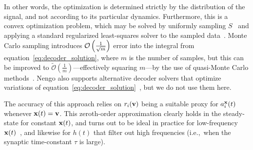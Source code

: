 In other words, the optimization is determined strictly by the distribution of the signal, and not according to its particular dynamics.
Furthermore, this is a convex optimization problem, which may be solved by uniformly sampling $S$~\citep{voelker2017} and applying a standard regularized least-squares solver to the sampled data~\citep{bekolay2013}.
Monte Carlo sampling introduces $\mathcal{O}\left({ \frac{1}{\sqrt{m}} }\right)$ error into the integral from equation~\ref{eq:decoder_solution}, where $m$ is the number of samples, but this can be improved to $\widetilde{\mathcal{O}} \left( \frac{1}{m} \right)$---effectively squaring $m$---by the use of quasi-Monte Carlo methods~\citep{fang1994, voelker2016b}.
Nengo also supports alternative decoder solvers that optimize variations of equation~\ref{eq:decoder_solution}~\citep[e.g.,][]{voelker2016a, abrams2017}, but we do not use them here.


The accuracy of this approach relies on $r_i(\mathbf{v})$ being a suitable proxy for $a_i^{\mathbf{x}}(t)$ whenever $\mathbf{x}(t) = \mathbf{v}$.
This zeroth-order approximation clearly holds in the steady-state for constant $\mathbf{x}(t)$, and turns out to be ideal in practice for low-frequency $\mathbf{x}(t)$~\citep[][appendix~F.1]{eliasmith2003a}, and likewise for $h(t)$ that filter out high frequencies (i.e.,~when the synaptic time-constant $\tau$ is large).

